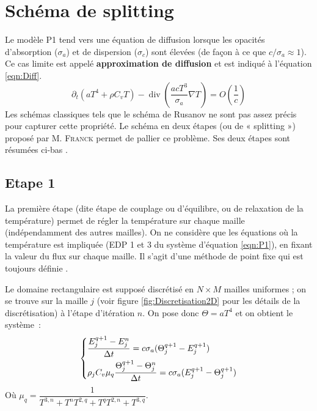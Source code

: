 
\section{Schéma de splitting}

Le modèle P1 tend vers une équation de diffusion lorsque les opacités d'absorption ($\sigma_a$) et de dispersion ($\sigma_c$) sont élevées (de façon à ce que $c/\sigma_a \approx 1$). Ce cas limite est appelé \textbf{approximation de diffusion} et est indiqué à l'équation \ref{eqn:Diff}.
\begin{equation}
\partial_t \left( aT^4 + \rho C_v T \right) - \operatorname{div} \left(\frac{acT^3}{\sigma_a} \nabla T \right) = O\left( \frac{1}{c} \right)
\label{eqn:Diff}
\end{equation}
Les schémas classiques tels que le schéma de Rusanov ne sont pas assez précis pour capturer cette propriété. Le schéma en deux étapes (ou de « splitting ») proposé par M. \textsc{Franck} permet de pallier ce problème. Ses deux étapes sont résumées ci-bas \parencite{Reference4}.


\subsection{Etape 1}
La première étape (dite étape de couplage ou d'équilibre, ou de relaxation de la température) permet de régler la température sur chaque maille (indépendamment des autres mailles). On ne considère que les équations où la température est impliquée (EDP 1 et 3 du système d'équation \ref{eqn:P1}), en fixant la valeur du flux sur chaque maille. Il s'agit d'une méthode de point fixe qui est toujours définie \parencite{Reference2}.

Le domaine rectangulaire est supposé discrétisé en $N \times M$ mailles uniformes ; on se trouve sur la maille $j$ (voir figure \ref{fig:Discretisation2D} pour les détails de la discrétisation) à l'étape d'itération $n$. On pose donc $\Theta = aT^4$ et on obtient le système :
\begingroup
\normalsize
\begin{equation*}
    \begin{dcases}
     \dfrac{E_j^{q+1} - E_j^{n}}{\Delta t} = c \sigma_a ( \Theta_j^{q+1} - E_j^{q+1}) \\
     \rho_j C_v \mu_q \dfrac{\Theta_j^{q+1} - \Theta_j^{n}}{\Delta t} = c \sigma_a (E_j^{q+1} - \Theta_j^{q+1}) 
    \end{dcases}
\end{equation*}
\endgroup
Où $\mu_q = \dfrac{1}{T^{3,n} + T^{n}T^{2,q} + T^{q}T^{2,n} + T^{3,q}}$.

